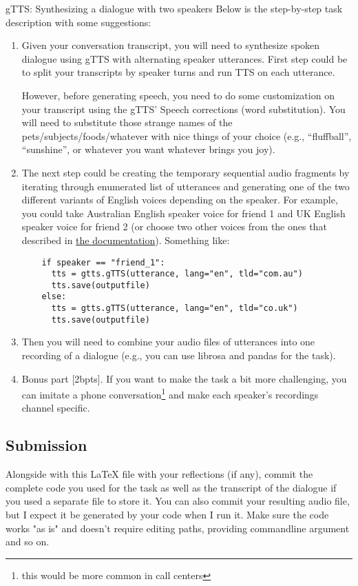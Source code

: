 \documentclass{../labbook}
\begin{document}
\begin{problem}{1}{10}{gTTS: Synthesizing a dialogue with two speakers}
Below is the step-by-step task description with some suggestions:
\begin{enumerate}
      \item Given your conversation transcript, you will need to synthesize spoken dialogue using gTTS with alternating speaker utterances. First step could be to split your transcripts by speaker turns and run TTS on each utterance.
    
    However, before generating speech, you need to do some customization on your transcript using the gTTS' Speech corrections (word substitution). You will need to substitute those strange names of the pets/subjects/foods/whatever with nice things of your choice (e.g., ``fluffball'', ``sunshine'', or whatever you want whatever brings you joy).

    \item The next step could be creating the temporary sequential audio fragments by iterating through enumerated list of utterances and generating one of the two different variants of English voices depending on the speaker. 
    For example, you could take Australian English speaker voice for friend 1 and UK English speaker voice for friend 2 (or choose two other voices from the ones that described in \href{https://gtts.readthedocs.io/en/latest/module.html}{the documentation}). Something like:
    \begin{verbatim}
    if speaker == "friend_1":
      tts = gtts.gTTS(utterance, lang="en", tld="com.au")
      tts.save(outputfile)
    else:
      tts = gtts.gTTS(utterance, lang="en", tld="co.uk")
      tts.save(outputfile)
    \end{verbatim}

    \item Then you will need to combine your audio files of utterances into one recording of a dialogue (e.g., you can use librosa and pandas for the task). 
    
    \item Bonus part [2bpts]. If you want to make the task a bit more challenging, you can imitate a phone conversation\footnote{this would be more common in call centers} and make each speaker's recordings channel specific.
    
\end{enumerate}
\subsection*{Submission}
\noindent Alongside with this LaTeX file with your reflections (if any), commit the complete code you used for the task as well as the transcript of the dialogue if you used a separate file to store it. You can also commit your resulting audio file, but I expect it be generated by your code when I run it. 
Make sure the code works "as is" and doesn't require editing paths, providing commandline argument and so on.

\end{problem}
\end{document}
